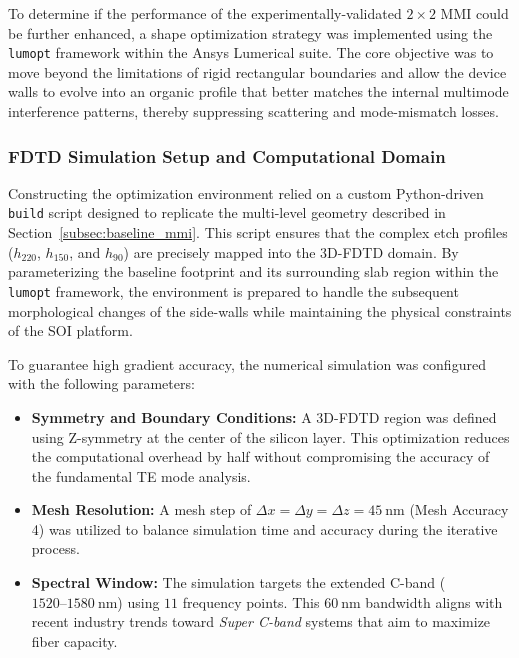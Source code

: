 To determine if the performance of the experimentally-validated $2\times2$ MMI could be further 
enhanced, a shape optimization strategy was implemented using the \texttt{lumopt} framework within 
the Ansys Lumerical suite. The core objective was to move beyond the limitations of rigid 
rectangular boundaries and allow the device walls to evolve into an organic profile that better 
matches the internal multimode interference patterns, thereby suppressing scattering and 
mode-mismatch losses.

\subsubsection{FDTD Simulation Setup and Computational Domain}

Constructing the optimization environment relied on a custom Python-driven \texttt{build} script 
designed to replicate the multi-level geometry described in Section~\ref{subsec:baseline_mmi}. 
This script ensures that the complex etch profiles ($h_{220}$, $h_{150}$, and $h_{90}$) are 
precisely mapped into the 3D-FDTD domain. By parameterizing the baseline footprint and its 
surrounding slab region within the \texttt{lumopt} framework, the environment is prepared to handle 
the subsequent morphological changes of the side-walls while maintaining the physical constraints 
of the SOI platform.

To guarantee high gradient accuracy, the numerical simulation was configured with the following 
parameters:
\begin{itemize}
    \item \textbf{Symmetry and Boundary Conditions:} A 3D-FDTD region was defined using Z-symmetry 
    at the center of the silicon layer. This optimization reduces the computational overhead by 
    half without compromising the accuracy of the fundamental TE mode analysis.
    \item \textbf{Mesh Resolution:} A mesh step of $\Delta x = \Delta y = \Delta z = 45~\text{nm}$ 
    (Mesh Accuracy 4) was utilized to balance simulation time and accuracy during the iterative 
    process. 
    \item \textbf{Spectral Window:} The simulation targets the extended C-band 
    ($1520\text{--}1580~\text{nm}$) using $11$ frequency points. This $60~\text{nm}$ bandwidth 
    aligns with recent industry trends toward \textit{Super C-band} systems that aim to maximize 
    fiber capacity.
\end{itemize}


